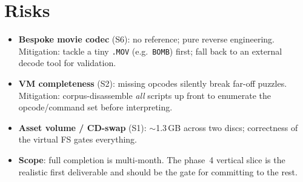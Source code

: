 \documentclass[11pt]{article}
\newcommand{\code}[1]{\texttt{#1}}
\begin{document}
\section{Risks}
\begin{itemize}[nosep]
  \item \textbf{Bespoke movie codec} (S6): no reference; pure reverse
        engineering. Mitigation: tackle a tiny \code{.MOV} (e.g.\ \code{BOMB})
        first; fall back to an external decode tool for validation.
  \item \textbf{VM completeness} (S2): missing opcodes silently break far-off
        puzzles. Mitigation: corpus-disassemble \emph{all} scripts up front to
        enumerate the opcode/command set before interpreting.
  \item \textbf{Asset volume / CD-swap} (S1): $\sim$1.3\,GB across two discs;
        correctness of the virtual FS gates everything.
  \item \textbf{Scope}: full completion is multi-month. The phase~4 vertical
        slice is the realistic first deliverable and should be the gate for
        committing to the rest.
\end{itemize}
\end{document}
